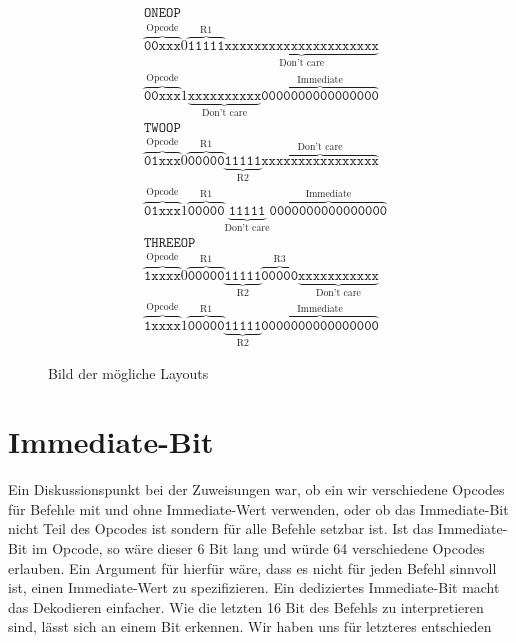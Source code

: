 \documentclass[paper=a4,fontsize=11pt,twocolumn]{scrreprt}
\begin{document}
\begin{figure}[ht]
\centering
\begin{align*}
&\texttt{ONEOP}\\
&\overbrace{\texttt{00xxx}}^\text{Opcode}
0
\overbrace{\texttt{11111}}^\text{R1}
\underbrace{\texttt{xxxxxxxxxxxxxxxxxxxxx}}_\text{Don't care}\\
&\overbrace{\texttt{00xxx}}^\text{Opcode}
1
\underbrace{\texttt{xxxxxxxxxx}}_\text{Don't care}
\overbrace{\texttt{0000000000000000}}^\text{Immediate}\\
&\texttt{TWOOP}\\
&\overbrace{\texttt{01xxx}}^\text{Opcode}
0
\overbrace{\texttt{00000}}^\text{R1}
\underbrace{\texttt{11111}}_\text{R2}
\overbrace{\texttt{xxxxxxxxxxxxxxxx}}^\text{Don't care}\\
&\overbrace{\texttt{01xxx}}^\text{Opcode}
1
\overbrace{\texttt{00000}}^\text{R1}
\underbrace{\texttt{11111}}_\text{Don't care}
\overbrace{\texttt{0000000000000000}}^\text{Immediate}\\
&\texttt{THREEOP}\\
&\overbrace{\texttt{1xxxx}}^\text{Opcode}
0
\overbrace{\texttt{00000}}^\text{R1}
\underbrace{\texttt{11111}}_\text{R2}
\overbrace{\texttt{00000}}^\text{R3}
\underbrace{\texttt{xxxxxxxxxxx}}_\text{Don't care}\\
&\overbrace{\texttt{1xxxx}}^\text{Opcode}
1
\overbrace{\texttt{00000}}^\text{R1}
\underbrace{\texttt{11111}}_\text{R2}
\overbrace{\texttt{0000000000000000}}^\text{Immediate}
\end{align*}
\label{fig:op_code_structure}
\caption{Bild der mögliche Layouts}
\end{figure}

\section{Immediate-Bit}
\label{sec:immediate_bit}
Ein Diskussionspunkt bei der Zuweisungen war, ob ein wir verschiedene Opcodes für Befehle mit und ohne Immediate-Wert verwenden, oder ob das Immediate-Bit nicht Teil des Opcodes ist sondern für alle Befehle setzbar ist.
Ist das Immediate-Bit im Opcode, so wäre dieser 6 Bit lang und würde 64 verschiedene Opcodes erlauben.
Ein Argument für hierfür wäre, dass es nicht für jeden Befehl sinnvoll ist, einen Immediate-Wert zu spezifizieren.
Ein dediziertes Immediate-Bit macht das Dekodieren einfacher.
Wie die letzten 16 Bit des Befehls zu interpretieren sind, lässt sich an einem Bit erkennen.
Wir haben uns für letzteres entschieden
\end{document}
